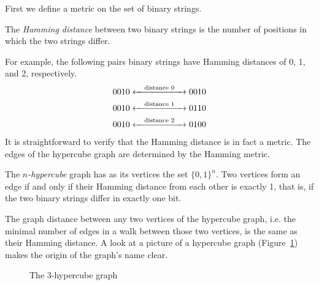 \documentclass[cclicense]{hmcthesis}
\newcommand*{\x}[1]{\ensuremath{X^{(#1)}}}
\numberwithin{equation}{chapter}
\numberwithin{thmcounter}{chapter}
\begin{document}
    First we define a metric on the set of binary strings.
    \begin{definition}
    The \emph{Hamming distance} between two binary strings is the number of
    positions in which the two strings differ.  
    \end{definition}
    For example, the following pairs binary strings have Hamming distances
    of 0, 1, and 2, respectively.
    \begin{align*}
        0010 &\xleftrightarrow{\quad\text{distance $0$}\quad} 0010 \\
        0010 &\xleftrightarrow{\quad\text{distance $1$}\quad} 0110 \\
        0010 &\xleftrightarrow{\quad\text{distance $2$}\quad} 0100
    \end{align*}
    It is straightforward to verify that the Hamming distance is in fact a
    metric.  The edges of the hypercube graph are determined by the Hamming
    metric.
    \begin{definition}
        The \emph{$n$-hypercube} graph has as its vertices the set $\{0, 1\}^n$.
        Two vertices form an edge if and only if their Hamming distance from
        each other is exactly 1, that is, if the two binary strings differ in
        exactly one bit.
    \end{definition}
    The graph distance between any two vertices of the hypercube graph, i.e. the
    minimal number of edges in a walk between those two vertices, is the same as
    their Hamming distance.  A look at a picture of a hypercube graph
    (Figure~\ref{fig:hypercube}) makes the origin of the graph's name clear.

    \begin{figure}[h]
        \centering


        \caption{The $3$-hypercube graph}
        \label{fig:hypercube}
    \end{figure}
    
\end{document}
